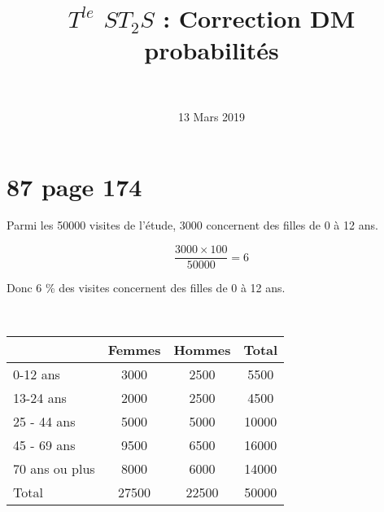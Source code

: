 \documentclass[a4paper,11pt]{exam}
\author{\ }
\date{13 Mars 2019}
\title{$T^{le}$ $ST_2S$ : Correction DM probabilités}
\begin{document}
	
\maketitle
	
\section{87 page 174}

\begin{questions}
	\question Parmi les \num{50000} visites de l'étude, \num{3000} concernent des filles de 0 à 12 ans.
	
	\begin{equation*}
		\frac{\num{3000} \times 100}{\num{50000}} = 6
	\end{equation*}
	
	Donc 6 \% des visites concernent des filles de 0 à 12 ans.
	
	\question \ \\
	
	\begin{tabular}{|l|c|c|c|}
		\hline
		& Femmes      & Hommes      & Total       \\ \hline
		0-12 ans       & \num{3000}  & \num{2500}  & \num{5500}  \\ \hline
		13-24 ans      & \num{2000}  & \num{2500}  & \num{4500}  \\ \hline
		25 - 44 ans    & \num{5000}  & \num{5000}  & \num{10000} \\ \hline
		45 - 69 ans    & \num{9500}  & \num{6500}  & \num{16000} \\ \hline
		70 ans ou plus & \num{8000}  & \num{6000}  & \num{14000} \\ \hline
		Total          & \num{27500} & \num{22500} & \num{50000} \\ \hline
	\end{tabular}

	\question
\end{questions}
\end{document}
